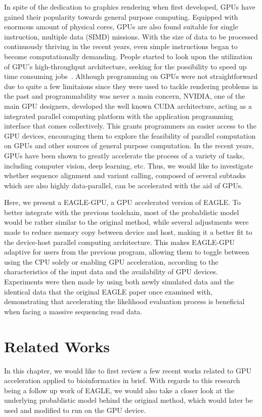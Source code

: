 \documentclass{PHlab-thesis}
\begin{document}
In spite of the dedication to graphics rendering when first developed, GPUs have gained their popularity towards general purpose computing. Equipped with enormous amount of physical cores, GPUs are also found suitable for single instruction, multiple data (SIMD) missions. With the size of data to be processed continuously thriving in the recent years, even simple instructions began to become computationally demanding. People started to look upon the utilization of GPU's high-throughput architecture, seeking for the possibility to speed up time consuming jobs~\cite{owens2008gpu,nickolls2010gpu}. Although programming on GPUs were not straightforward due to quite a few limitaions since they were used to tackle rendering problems in the past and programmability was never a main concern, NVIDIA, one of the main GPU designers, developed the well known CUDA architecture, acting as a integrated parallel computing platform with the application programming interface that comes collectively. This grants programmers an easier access to the GPU devices, encouraging them to explore the feasibility of parallel computation on GPUs and other sources of general purpose computation. In the recent years, GPUs have been shown to greatly accelerate the process of a variety of tasks, including computer vision, deep learning, etc. Thus, we would like to investigate whether sequence alignment and variant calling, composed of several subtasks which are also highly data-parallel, can be accelerated with the aid of GPUs.

Here, we present a EAGLE-GPU, a GPU accelerated version of EAGLE. To better integrate with the previous toolchain, most of the probablistic model would be rather similar to the original method, while several adjustments were made to reduce memory copy between device and host, making it a better fit to the device-host parallel computing architecture. This makes EAGLE-GPU adaptive for users from the previous program, allowing them to toggle between using the CPU solely or enabling GPU acceleration, according to the characteristics of the input data and the availability of GPU devices. Experiments were then made by using both newly simulated data and the identical data that the original EAGLE paper once examined with, demonstrating that accelerating the likelihood evaluation process is beneficial when facing a massive sequencing read data.

\chapter{Related Works}
In this chapter, we would like to first review a few recent works related to GPU acceleration applied to bioinformatics in brief. With regards to this research being a follow up work of EAGLE, we would also take a closer look at the underlying probablistic model behind the original method, which would later be used and modified to run on the GPU device.
\end{document}
